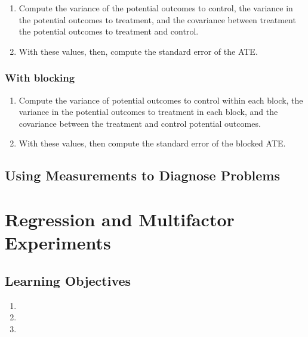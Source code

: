 \documentclass[
]{book}
\providecommand{\tightlist}{%
  \setlength{\itemsep}{0pt}\setlength{\parskip}{0pt}}
\begin{document}
\begin{enumerate}
\def\labelenumi{\arabic{enumi}.}
\tightlist
\item
  Compute the variance of the potential outcomes to control, the
  variance in the potential outcomes to treatment, and the covariance
  between treatment the potential outcomes to treatment and control.
\item
  With these values, then, compute the standard error of the ATE.
\end{enumerate}

\hypertarget{with-blocking}{%
\subsection{With blocking}\label{with-blocking}}

\begin{enumerate}
\def\labelenumi{\arabic{enumi}.}
\tightlist
\item
  Compute the variance of potential outcomes to control within each
  block, the variance in the potential outcomes to treatment in each
  block, and the covariance between the treatment and control potential
  outcomes.
\item
  With these values, then compute the standard error of the blocked ATE.
\end{enumerate}

\hypertarget{using-measurements-to-diagnose-problems}{%
\section{Using Measurements to Diagnose
Problems}\label{using-measurements-to-diagnose-problems}}

\hypertarget{regression-and-multifactor-experiments}{%
\chapter{Regression and Multifactor
Experiments}\label{regression-and-multifactor-experiments}}

\hypertarget{learning-objectives-5}{%
\section{Learning Objectives}\label{learning-objectives-5}}

\begin{enumerate}
\def\labelenumi{\arabic{enumi}.}
\tightlist
\item
\item
\item
\end{enumerate}
\end{document}
